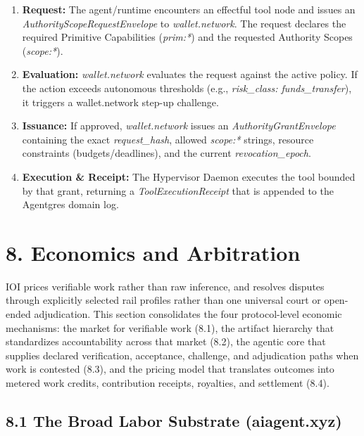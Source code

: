 \documentclass[
  11pt,
]{article}
\providecommand{\tightlist}{%
  \setlength{\itemsep}{0pt}\setlength{\parskip}{0pt}}
\begin{document}
\begin{enumerate}
\def\labelenumi{\arabic{enumi}.}
\tightlist
\item
  \textbf{Request:} The agent/runtime encounters an effectful tool node
  and issues an \emph{AuthorityScopeRequestEnvelope} to
  \emph{wallet.network}. The request declares the required Primitive
  Capabilities (\emph{prim:*}) and the requested Authority Scopes
  (\emph{scope:*}).
\item
  \textbf{Evaluation:} \emph{wallet.network} evaluates the request
  against the active policy. If the action exceeds autonomous thresholds
  (e.g., \emph{risk\_class: funds\_transfer}), it triggers a
  wallet.network step-up challenge.
\item
  \textbf{Issuance:} If approved, \emph{wallet.network} issues an
  \emph{AuthorityGrantEnvelope} containing the exact
  \emph{request\_hash}, allowed \emph{scope:*} strings, resource
  constraints (budgets/deadlines), and the current
  \emph{revocation\_epoch}.
\item
  \textbf{Execution \& Receipt:} The Hypervisor Daemon executes the tool
  bounded by that grant, returning a \emph{ToolExecutionReceipt} that is
  appended to the Agentgres domain log.
\end{enumerate}

\hypertarget{economics-and-arbitration}{%
\section{8. Economics and Arbitration}\label{economics-and-arbitration}}

IOI prices verifiable work rather than raw inference, and resolves
disputes through explicitly selected rail profiles rather than one universal
court or open-ended adjudication.
This section consolidates the four protocol-level economic mechanisms:
the market for verifiable work (8.1), the artifact hierarchy that
standardizes accountability across that market (8.2), the agentic core
that supplies declared verification, acceptance, challenge, and adjudication
paths when work is contested (8.3),
and the pricing model that translates outcomes into metered work
credits, contribution receipts, royalties, and settlement (8.4).

\hypertarget{the-broad-labor-substrate-aiagent.xyz}{%
\subsection{8.1 The Broad Labor Substrate
(aiagent.xyz)}\label{the-broad-labor-substrate-aiagent.xyz}}
\end{document}
